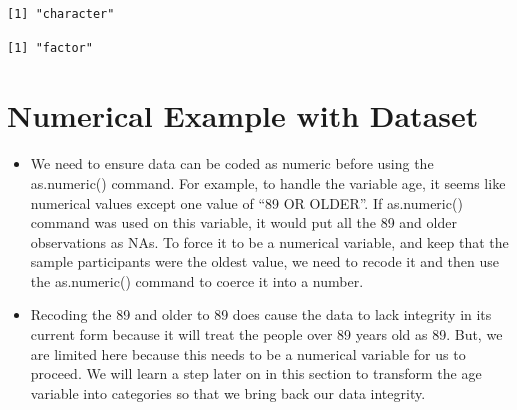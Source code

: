 \documentclass[
  letterpaper,
  DIV=11,
  numbers=noendperiod]{scrreprt}
\newenvironment{Shaded}{\begin{snugshade}}{\end{snugshade}}
\newcommand{\CommentTok}[1]{\textcolor[rgb]{0.37,0.37,0.37}{#1}}
\newcommand{\FloatTok}[1]{\textcolor[rgb]{0.68,0.00,0.00}{#1}}
\newcommand{\FunctionTok}[1]{\textcolor[rgb]{0.28,0.35,0.67}{#1}}
\newcommand{\NormalTok}[1]{\textcolor[rgb]{0.00,0.23,0.31}{#1}}
\newcommand{\OtherTok}[1]{\textcolor[rgb]{0.00,0.23,0.31}{#1}}
\newcommand{\SpecialCharTok}[1]{\textcolor[rgb]{0.37,0.37,0.37}{#1}}
\providecommand{\tightlist}{%
  \setlength{\itemsep}{0pt}\setlength{\parskip}{0pt}}\usepackage{longtable,booktabs,array}
\begin{document}
\begin{verbatim}
[1] "character"
\end{verbatim}

\begin{Shaded}
\end{Shaded}

\begin{verbatim}
[1] "factor"
\end{verbatim}

\section{Numerical Example with
Dataset}\label{numerical-example-with-dataset}

\begin{itemize}
\tightlist
\item
  We need to ensure data can be coded as numeric before using the
  as.numeric() command. For example, to handle the variable age, it
  seems like numerical values except one value of ``89 OR OLDER''. If
  as.numeric() command was used on this variable, it would put all the
  89 and older observations as NAs. To force it to be a numerical
  variable, and keep that the sample participants were the oldest value,
  we need to recode it and then use the as.numeric() command to coerce
  it into a number.
\item
  Recoding the 89 and older to 89 does cause the data to lack integrity
  in its current form because it will treat the people over 89 years old
  as 89. But, we are limited here because this needs to be a numerical
  variable for us to proceed. We will learn a step later on in this
  section to transform the age variable into categories so that we bring
  back our data integrity.
\end{itemize}

\begin{Shaded}
\end{Shaded}
\end{document}
